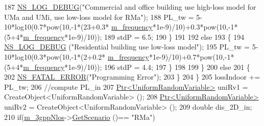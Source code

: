 \begin{DoxyCode}
187                                                         \hyperlink{group__logging_ga413f1886406d49f59a6a0a89b77b4d0a}{NS\_LOG\_DEBUG}(\textcolor{stringliteral}{"Commercial and office
       building use high-loss model for UMa and UMi, use low-loss model for RMa"});
188                                                         PL\_tw = 5-10*log10(0.7*pow(10,-1*(23+0.3*
      \hyperlink{classns3_1_1MmWave3gppBuildingsPropagationLossModel_ad7de82f89dfd910f127ce775fec14898}{m\_frequency}*1e-9)/10)+0.3*pow(10,-1*(5+4*\hyperlink{classns3_1_1MmWave3gppBuildingsPropagationLossModel_ad7de82f89dfd910f127ce775fec14898}{m\_frequency}*1e-9)/10));
189                                                         stdP = 6.5;
190                                                 \}
191 
192                                                 \textcolor{keywordflow}{else}
193                                                 \{
194                                                         \hyperlink{group__logging_ga413f1886406d49f59a6a0a89b77b4d0a}{NS\_LOG\_DEBUG} (\textcolor{stringliteral}{"Residential building use
       low-loss model"});
195                                                         PL\_tw = 5-10*log10(0.3*pow(10,-1*(2+0.2*
      \hyperlink{classns3_1_1MmWave3gppBuildingsPropagationLossModel_ad7de82f89dfd910f127ce775fec14898}{m\_frequency}*1e-9)/10)+0.7*pow(10,-1*(5+4*\hyperlink{classns3_1_1MmWave3gppBuildingsPropagationLossModel_ad7de82f89dfd910f127ce775fec14898}{m\_frequency}*1e-9)/10));
196                                                         stdP = 4.4;
197                                                 \}
198 
199                                         \}
200                                         \textcolor{keywordflow}{else}
201                                         \{
202                                                 \hyperlink{group__fatal_ga5131d5e3f75d7d4cbfd706ac456fdc85}{NS\_FATAL\_ERROR}(\textcolor{stringliteral}{"Programming Error"});
203                                         \}
204                                 \}
205                                 lossIndoor += PL\_tw;
206                                 \textcolor{comment}{//compute PL\_in}
207                                 \hyperlink{classns3_1_1Ptr}{Ptr<UniformRandomVariable>} uniRv1 = 
      CreateObject<UniformRandomVariable> ();
208                                 \hyperlink{classns3_1_1Ptr}{Ptr<UniformRandomVariable>} uniRv2 = 
      CreateObject<UniformRandomVariable> ();
209                                 \textcolor{keywordtype}{double} dis\_2D\_in;
210                                 \textcolor{keywordflow}{if}(\hyperlink{classns3_1_1MmWave3gppBuildingsPropagationLossModel_a18ac2d667b12fa593c0ea044ad05af82}{m\_3gppNlos}->\hyperlink{classMmWave3gppPropagationLossModel_ae092a58d42801c732956d64e0fe250eb}{GetScenario} ()== \textcolor{stringliteral}{"RMa"})

\end{DoxyCode}
